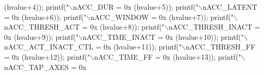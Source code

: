 \begin{DoxyCode}
{{{{{      (hvalue+4));
  printf(\textcolor{stringliteral}{"\(\backslash\)nACC\_DUR = 0x%
      (hvalue+5));
  printf(\textcolor{stringliteral}{"\(\backslash\)nACC\_LATENT = 0x%
      (hvalue+6));
  printf(\textcolor{stringliteral}{"\(\backslash\)nACC\_WINDOW = 0x%
      (hvalue+7));
  printf(\textcolor{stringliteral}{"\(\backslash\)nACC\_THRESH\_ACT = 0x%
      (hvalue+8));
  printf(\textcolor{stringliteral}{"\(\backslash\)nACC\_THRESH\_INACT = 0x%
      (hvalue+9));
  printf(\textcolor{stringliteral}{"\(\backslash\)nACC\_TIME\_INACT = 0x%
      (hvalue+10));
  printf(\textcolor{stringliteral}{"\(\backslash\)nACC\_ACT\_INACT\_CTL = 0x%
      (hvalue+11));
  printf(\textcolor{stringliteral}{"\(\backslash\)nACC\_THRESH\_FF = 0x%
      (hvalue+12));
  printf(\textcolor{stringliteral}{"\(\backslash\)nACC\_TIME\_FF = 0x%
      (hvalue+13));
  printf(\textcolor{stringliteral}{"\(\backslash\)nACC\_TAP\_AXES = 0x%
}}}}}}}}}}}}}}}
\end{DoxyCode}
